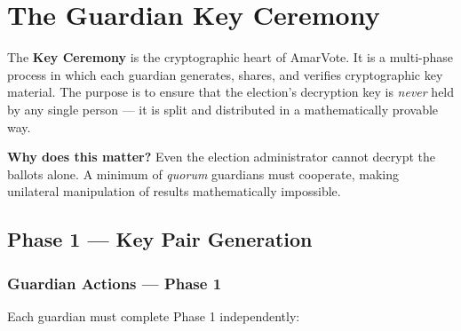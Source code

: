 \documentclass[12pt,a4paper,openany]{book}
\begin{document}
\chapter{The Guardian Key Ceremony}
\label{ch:key-ceremony}

The \textbf{Key Ceremony} is the cryptographic heart of AmarVote. It is a multi-phase process in which each guardian generates, shares, and verifies cryptographic key material. The purpose is to ensure that the election's decryption key is \emph{never} held by any single person --- it is split and distributed in a mathematically provable way.

\begin{tcolorbox}[notebox]
	\textbf{Why does this matter?} Even the election administrator cannot decrypt the ballots alone. A minimum of \emph{quorum} guardians must cooperate, making unilateral manipulation of results mathematically impossible.
\end{tcolorbox}

\section{Phase 1 --- Key Pair Generation}
\label{sec:phase1}

\subsection{Guardian Actions --- Phase 1}

Each guardian must complete Phase 1 independently:
\end{document}
